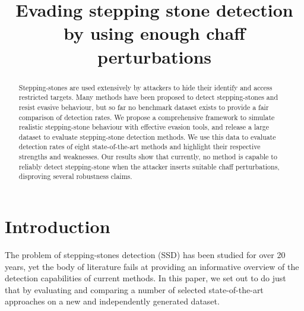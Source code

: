 \documentclass[runningheads,11pt]{llncs}\usepackage[]{graphicx}\usepackage[]{color}
\begin{document}
\title{Evading stepping stone detection by using enough chaff perturbations}



\maketitle     

\begin{abstract}

Stepping-stones are used extensively by attackers to hide their identify and access restricted targets. Many methods have been proposed to detect stepping-stones and resist evasive behaviour, but so far no benchmark dataset exists to provide a fair comparison of detection rates. We propose a comprehensive framework to simulate realistic stepping-stone behaviour with effective evasion tools, and release a large dataset to evaluate stepping-stone detection methods. 
We use this data to evaluate detection rates of eight state-of-the-art methods and highlight their respective strengths and weaknesses. Our results show that currently, no method is capable to reliably detect stepping-stone when the attacker inserts suitable chaff perturbations, disproving several robustness claims.
\end{abstract}



\section{Introduction}\label{Sec:Introduction}


The problem of stepping-stones detection (SSD) has been studied for over 20 years, yet the body of literature fails at providing an informative overview of the detection capabilities of current methods. In this paper, we set out to do just that by evaluating and comparing a number of selected state-of-the-art approaches on a new and independently generated dataset.

\end{document}

